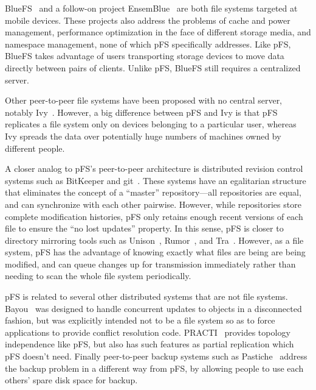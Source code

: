 BlueFS~\cite{nightingale:bluefs} and a follow-on project
EnsemBlue~\cite{nightingale:bluefs} are both file systems targeted at
mobile devices.  These projects also address the problems of cache and
power management, performance optimization in the face of different
storage media, and namespace management, none of which pFS
specifically addresses.  Like pFS, BlueFS takes advantage of users
transporting storage devices to move data directly between pairs of
clients.  Unlike pFS, BlueFS still requires a centralized server.

Other peer-to-peer file systems have been proposed with no central
server, notably Ivy~\cite{muthitacharoen:ivy}.  However, a big
difference between pFS and Ivy is that pFS replicates a file system
only on devices belonging to a particular user, whereas Ivy spreads
the data over potentially huge numbers of machines owned by different
people.

A closer analog to pFS's peer-to-peer architecture is distributed
revision control systems such as BitKeeper and git~\cite{git}.  These
systems have an egalitarian structure that eliminates the concept of a
``master'' repository---all repositories are equal, and can
synchronize with each other pairwise.  However, while repositories
store complete modification histories, pFS only retains enough recent
versions of each file to ensure the ``no lost updates'' property.  In
this sense, pFS is closer to directory mirroring tools such as
Unison~\cite{balasubramanian:unison}, Rumor~\cite{guy:rumor}, and
Tra~\cite{cox:tra}.  However, as a file system, pFS has the advantage
of knowing exactly what files are being are being modified, and can
queue changes up for transmission immediately rather than needing to
scan the whole file system periodically.

pFS is related to several other distributed systems that are not file
systems.  Bayou~\cite{petersen:flexible-update} was designed to handle
concurrent updates to objects in a disconnected fashion, but was
explicitly intended not to be a file system so as to force
applications to provide conflict resolution code.
PRACTI~\cite{belaramani:practi} provides topology independence like
pFS, but also has such features as partial replication which pFS
doesn't need.  Finally peer-to-peer backup systems such as
Pastiche~\cite{cox:pastiche} \cite{nguyen:friendstore} address the
backup problem in a different way from pFS, by allowing people to use
each others' spare disk space for backup.



